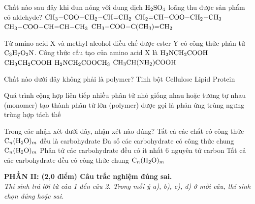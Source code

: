 \documentclass[11pt,a4paper]{article}
\begin{document}
\begin{ex}
Chất nào sau đây khi đun nóng với dung dịch $\ce{H2SO4}$ loãng thu được sản phẩm có aldehyde?
\choice
{$\ce{CH3-COO-CH2-CH=CH2}$}
{$\ce{CH2=CH-COO-CH2-CH3}$}
{\True $\ce{CH3-COO-CH=CH-CH3}$}
{$\ce{CH3-COO-C(CH3)=CH2}$}

\end{ex}
\begin{ex}
Từ amino acid X và methyl alcohol điều chế được ester Y có công thức phân tử $\ce{C3H7O2N}$. Công thức cấu tạo của amino acid X là
\choice
{\True $\ce{H2NCH2COOH}$}
{$\ce{CH3CH2COOH}$}
{$\ce{H2NCH2COOCH3}$}
{$\ce{CH3CH(NH2)COOH}$}

\end{ex}
\begin{ex}
Chất nào dưới đây không phải là polymer?
\choice
{Tinh bột}
{Cellulose}
{\True Lipid}
{Protein}

\end{ex}
\begin{ex}
Quá trình cộng hợp liên tiếp nhiều phân tử nhỏ giống nhau hoặc tương tự nhau (monomer) tạo thành phân tử lớn (polymer) được gọi là phản ứng
\choice
{trùng ngưng}
{\True trùng hợp}
{tách}
{thế}

\end{ex}
\begin{ex}
Trong các nhận xét dưới đây, nhận xét nào đúng?
\choice
{Tất cả các chất có công thức $\ce{C_n(H2O)_m}$ đều là carbohydrate}
{\True Đa số các carbohydrate có công thức chung $\ce{C_n(H2O)_m}$}
{Phân tử các carbohydrate đều có ít nhất 6 nguyên tử carbon}
{Tất cả các carbohydrate đều có công thức chung $\ce{C_n(H2O)_m}$}

\end{ex}
\vspace{4pt}
\noindent
{\color{mainGreen}\textbf{\large PHẦN II: (2,0 điểm) Câu trắc nghiệm đúng sai.}}\\
\textit{\small Thí sinh trả lời từ câu 1 đến câu 2. Trong mỗi ý a), b), c), d) ở mỗi câu, thí sinh chọn đúng hoặc sai.}
\vspace{2pt}
\end{document}
